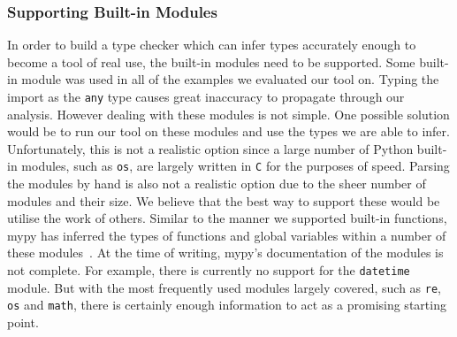 \documentclass[12pt, titlepage]{article}
\begin{document}
\subsubsection*{Supporting Built-in Modules}
In order to build a type checker which can infer types accurately enough to become a tool of real use, the built-in modules need to be supported. Some built-in module was used in all of the examples we evaluated our tool on. Typing the import as the \texttt{any} type causes great inaccuracy to propagate through our analysis. However dealing with these modules is not simple. One possible solution would be to run our tool on these modules and use the types we are able to infer. Unfortunately, this is not a realistic option since a large number of Python built-in modules, such as \texttt{os}, are largely written in \texttt{C} for the purposes of speed. Parsing the modules by hand is also not a realistic option due to the sheer number of modules and their size. We believe that the best way to support these would be utilise the work of others. Similar to the manner we supported built-in functions, mypy has inferred the types of functions and global variables within a number of these modules~\cite{mypy}. At the time of writing, mypy's documentation of the modules is not complete. For example, there is currently no support for the \texttt{datetime} module. But with the most frequently used modules largely covered, such as \texttt{re}, \texttt{os} and \texttt{math}, there is certainly enough information to act as a promising starting point.
\end{document}
